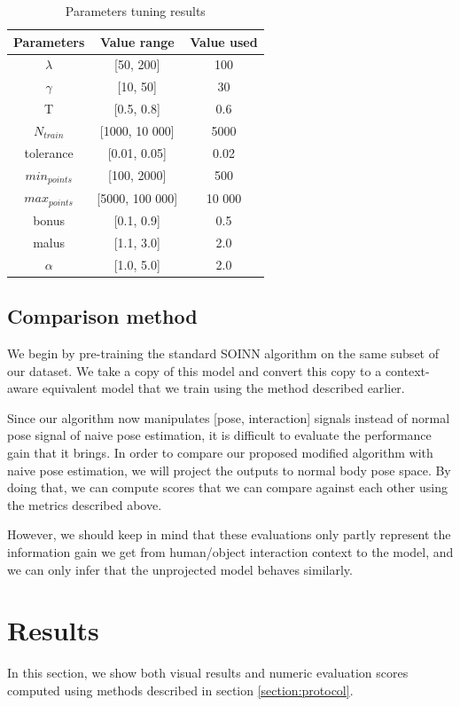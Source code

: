 \begin{table}[hp]
\centering
\caption{Parameters tuning results}
\label{tab:parameters}
\begin{tabular}{|c|c|c|}
    \hline
    Parameters & Value range & Value used \\
    \hline
    $\lambda$ & [50, 200] & 100 \\
    $\gamma$ & [10, 50] & 30 \\
    T & [0.5, 0.8] & 0.6 \\
    $N_{train}$ & [1000, 10 000] & 5000 \\
    tolerance & [0.01, 0.05] & 0.02 \\
    $min_{points}$ & [100, 2000] & 500 \\
    $max_{points}$ & [5000, 100 000] & 10 000 \\
    bonus & [0.1, 0.9] & 0.5 \\
    malus & [1.1, 3.0] & 2.0 \\
    $\alpha$ & [1.0, 5.0] & 2.0 \\
    \hline
\end{tabular}
\end{table}

\subsection{Comparison method}
We begin by pre-training the standard SOINN algorithm on the same subset of our dataset. We take a copy of this model and convert this copy to a context-aware equivalent model that we train using the method described earlier.

Since our algorithm now manipulates [pose, interaction] signals instead of normal pose signal of naive pose estimation, it is difficult to evaluate the performance gain that it brings. In order to compare our proposed modified algorithm with naive pose estimation, we will project the outputs to normal body pose space. By doing that, we can compute scores that we can compare against each other using the metrics described above. 

However, we should keep in mind that these evaluations only partly represent the information gain we get from human/object interaction context to the model, and we can only infer that the unprojected model behaves similarly.

\section{Results}
In this section, we show both visual results and numeric evaluation scores computed using methods described in section \ref{section:protocol}.
